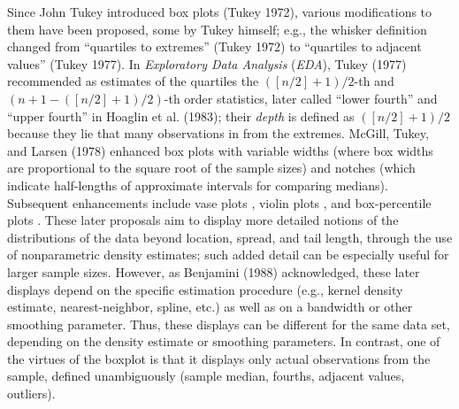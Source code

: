 \documentclass[11pt]{article}
\begin{document}
Since John Tukey introduced box plots (Tukey 1972), various 
modifications to them have been proposed, some by Tukey himself;
e.g., the whisker definition changed from ``quartiles to extremes'' 
(Tukey 1972) to ``quartiles to adjacent values'' (Tukey 1977).
In \textit{Exploratory Data Analysis} (\textit{EDA}), 
Tukey (1977) recommended as estimates of the quartiles the
$([n/2] + 1)/2$-th and $(n + 1 - ([n/2] + 1)/2)$-th 
order statistics, later called ``lower fourth'' and 
``upper fourth'' in Hoaglin et al. (1983); their \textit{depth} 
is defined as $([n/2] + 1)/2$ because they lie that
many observations in from the extremes.
McGill, Tukey, and Larsen (1978) enhanced box plots with 
variable widths (where box widths are proportional to the square 
root of the sample sizes) and notches (which indicate half-lengths 
of approximate intervals for comparing medians). 
Subsequent enhancements include vase plots \citep{vase}, violin plots \citep{violin}, and box-percentile plots \citep{box.percentiles}.
These later proposals aim to display more detailed
notions of the distributions of the data beyond location,
spread, and tail length, through the use
of nonparametric density estimates; such added detail can be
especially useful for larger sample sizes.  However, as
Benjamini (1988) acknowledged, these later displays depend 
on the specific estimation procedure
(e.g., kernel density estimate, nearest-neighbor, spline, etc.)
as well as on a bandwidth or other smoothing parameter.
Thus, these displays can be different for the same data set,
depending on the density estimate or smoothing parameters.
In contrast, one of the virtues of the boxplot is that it
displays only actual observations from the sample, defined
unambiguously
(sample median, fourths, adjacent values, outliers).  
\end{document}
